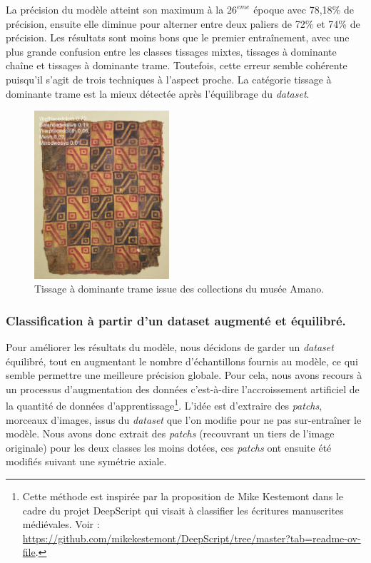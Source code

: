 La précision du modèle atteint son maximum à la $26^{eme}$ époque avec 78,18\% de précision, ensuite elle diminue pour alterner entre deux paliers de 72\% et 74\% de précision. Les résultats sont moins bons que le premier entraînement, avec une plus grande confusion entre les classes tissages mixtes, tissages à dominante chaîne et tissages à dominante trame. Toutefois, cette erreur semble cohérente puisqu'il s'agit de trois techniques à l'aspect proche. La catégorie tissage à dominante trame est la mieux détectée après l'équilibrage du \textit{dataset}.

\begin{figure}[!h]
	\begin{center}
		\includegraphics[width=5cm]{../images/AMANOweft2.png}
		\caption{Tissage à dominante trame issue des collections du musée Amano.}
	 \end{center}
\end{figure}

\subsubsection{Classification à partir d'un dataset augmenté et équilibré.}

Pour améliorer les résultats du modèle, nous décidons de garder un \textit{dataset} équilibré, tout en augmentant le nombre d'échantillons fournis au modèle, ce qui semble permettre une meilleure précision globale. Pour cela, nous avons recours à un processus d'augmentation des données c'est-à-dire l'accroissement artificiel de la quantité de données d'apprentissage\footnote{Cette méthode est inspirée par la proposition de Mike Kestemont dans le cadre du projet DeepScript qui visait à classifier les écritures manuscrites médiévales. Voir : \url{https://github.com/mikekestemont/DeepScript/tree/master?tab=readme-ov-file}.}. L'idée est d'extraire des \textit{patchs}, morceaux d'images, issus du \textit{dataset} que l'on modifie pour ne pas sur-entraîner le modèle. Nous avons donc extrait des \textit{patchs} (recouvrant un tiers de l'image originale) pour les deux classes les moins dotées, ces \textit{patchs} ont ensuite été modifiés suivant une symétrie axiale.


